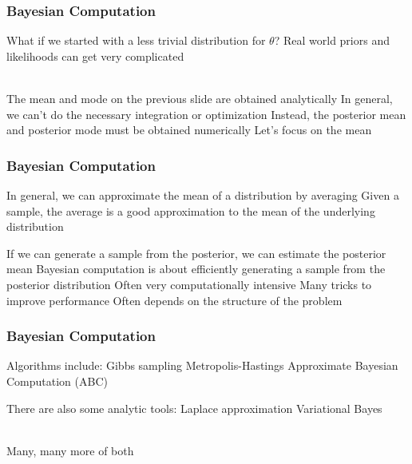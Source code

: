 \documentclass{beamer}
\begin{document}
\begin{frame}
    \frametitle{Bayesian Computation}\pause

    \begin{outline}
        \1<+-> What if we started with a less trivial distribution for $\theta$?
        \1<+-> Real world priors and likelihoods can get very complicated\\~\

        \1<+-> The mean and mode on the previous slide are obtained analytically
        \1<+-> In general, we can't do the necessary integration or optimization
        \1<+-> Instead, the posterior mean and posterior mode must be obtained numerically
            \2<+-> Let's focus on the mean
    \end{outline}
\end{frame}

\begin{frame}
    \frametitle{Bayesian Computation}

    \begin{outline}
        \1<+-> In general, we can approximate the mean of a distribution by averaging
            \2<+-> Given a sample, the average is a good approximation to the mean of the underlying distribution

        \1<+-> If we can generate a sample from the posterior, we can estimate the posterior mean
        \1<+-> Bayesian computation is about efficiently generating a sample from the posterior distribution 
            \2<+-> Often very computationally intensive
            \2<+-> Many tricks to improve performance
            \2<+-> Often depends on the structure of the problem
    \end{outline}
\end{frame}

\begin{frame}
    \frametitle{Bayesian Computation}

    \begin{outline}
        \1<+-> Algorithms include:
            \2<+-> Gibbs sampling
            \2<+-> Metropolis-Hastings
            \2<+-> Approximate Bayesian Computation (ABC)
        
        \1<+-> There are also some analytic tools:
            \2<+-> Laplace approximation
            \2<+-> Variational Bayes\\~\

        \1<+-> Many, many more of both

    \end{outline}
\end{frame}
\end{document}
